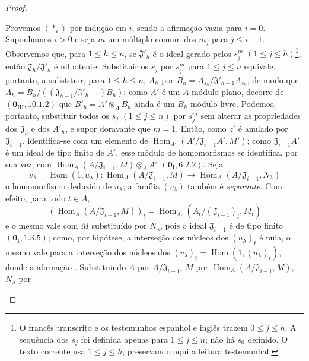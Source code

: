 \begin{proof}
\begin{enumerate}[label=(\roman*)]
  Provemos $(*_i)$ por
  indução em $i$, sendo
  a afirmação vazia
  para $i=0$. Suponhamos
  $i>0$ e seja $m$ um
  múltiplo comum dos
  $m_j$ para $j\leq i-1$.
  Observemos que, para
  $1\leq h\leq n$, se
  $\mathfrak J'_h$ é o
  ideal gerado pelos
  $s_j^m$
  $(1\leq j\leq h)$\footnote{O
  francês transcrito e
  os testemunhos espanhol
  e inglês trazem
  $0\leq j\leq h$.
  A sequência dos $s_j$
  foi definida apenas
  para $1\leq j\leq n$;
  não há $s_0$ definido.
  O texto corrente usa
  $1\leq j\leq h$,
  preservando aqui a
  leitura testemunhal.},
  então
  $\mathfrak J_h/
  \mathfrak J'_h$ é
  nilpotente. Substituir
  os $s_j$ por $s_j^m$
  para $1\leq j\leq n$
  equivale, portanto,
  a substituir, para
  $1\leq h\leq n$,
  $A_h$ por
  $B_h=A_{s_h}/
  \mathfrak J'_{h-1}
  A_{s_h}$, de modo que
  $A_h=B_h/
  ((\mathfrak J_{h-1}/
  \mathfrak J'_{h-1})B_h)$;
  como $A'$ é um
  $A$-módulo plano,
  decorre de
  $(\mathbf 0_{\mathrm{III}},
  10.1.2)$ que
  $B'_h=A'\otimes_A B_h$
  ainda é um
  $B_h$-módulo livre.
  Podemos, portanto,
  substituir todos os
  $s_j$
  $(1\leq j\leq n)$
  por $s_j^m$ sem
  alterar as propriedades
  dos $\mathfrak J_h$
  e dos $A'_h$,
  e supor doravante
  que $m=1$. Então,
  como $z'$ é anulado
  por $\mathfrak J_{i-1}$,
  identifica-se com um
  elemento de
  $\operatorname{Hom}_{A'}
  (A'/\mathfrak J_{i-1}A',
  M')$; como
  $\mathfrak J_{i-1}A'$
  é um ideal de tipo
  finito de $A'$,
  esse módulo de
  homomorfismos se
  identifica, por sua
  vez, com
  $\operatorname{Hom}_A
  (A/\mathfrak J_{i-1},M)
  \otimes_A A'$
  $(\mathbf 0_{\mathrm I},
  6.2.2)$. Seja
  \[
  v_\lambda=
  \operatorname{Hom}(1,u_\lambda):
  \operatorname{Hom}_A
  (A/\mathfrak J_{i-1},M)
  \longrightarrow
  \operatorname{Hom}_A
  (A/\mathfrak J_{i-1},
  N_\lambda)
  \]
  o homomorfismo deduzido
  de $u_\lambda$; a
  família $(v_\lambda)$
  também é
  \emph{separante}.
  Com efeito, para
  todo $t\in A$,
  \[
  (\operatorname{Hom}_A
  (A/\mathfrak J_{i-1},M))_t
  =
  \operatorname{Hom}_{A_t}
  (A_t/(\mathfrak J_{i-1})_t,
  M_t)
  \]
  e o mesmo vale com
  $M$ substituído por
  $N_\lambda$, pois
  o ideal
  $\mathfrak J_{i-1}$
  é de tipo finito
  $(\mathbf 0_{\mathrm I},
  1.3.5)$; como, por
  hipótese, a interseção
  dos núcleos dos
  $(u_\lambda)_t$ é
  nula, o mesmo vale
  para a interseção
  dos núcleos dos
  $(v_\lambda)_t=
  \operatorname{Hom}
  (1,(u_\lambda)_t)$,
  donde a afirmação
  .
  Substituindo $A$ por
  $A/\mathfrak J_{i-1}$,
  $M$ por
  $\operatorname{Hom}_A
  (A/\mathfrak J_{i-1},M)$,
  $N_\lambda$ por

\end{enumerate}
\end{proof}

